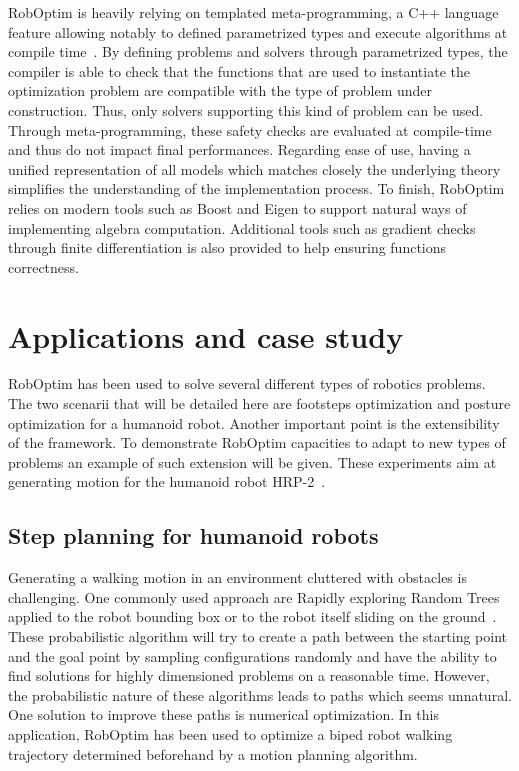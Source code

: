 \documentclass[conference,final,a4paper,twocolumn,9pt]{IEEEtran}
\begin{document}
RobOptim is heavily relying on templated meta-programming, a C++
language feature allowing notably to defined parametrized types and
execute algorithms at compile time~\cite{iso14882}. By defining
problems and solvers through parametrized types, the compiler is able
to check that the functions that are used to instantiate the
optimization problem are compatible with the type of problem under
construction. Thus, only solvers supporting this kind of problem can be
used. Through meta-programming, these safety checks are evaluated at
compile-time and thus do not impact final performances. Regarding ease
of use, having a unified representation of all models which matches
closely the underlying theory simplifies the understanding of the
implementation process.  To finish, RobOptim relies on modern tools
such as Boost and Eigen to support natural ways of implementing
algebra computation. Additional tools such as gradient checks through
finite differentiation is also provided to help ensuring functions
correctness.


\section{Applications and case study}\label{sec:application}


RobOptim has been used to solve several different types of robotics
problems. The two scenarii that will be detailed here are footsteps
optimization and posture optimization for a humanoid robot. Another
important point is the extensibility of the framework. To demonstrate
RobOptim capacities to adapt to new types of problems an example of
such extension will be given. These experiments aim at generating
motion for the humanoid robot HRP-2~\cite{hrp2}.


\subsection{Step planning for humanoid robots}


Generating a walking motion in an environment cluttered with obstacles
is challenging. One commonly used approach are Rapidly exploring
Random Trees
applied to the robot bounding box or to the robot itself sliding on the ground~\cite{dalibard2011small}.
These probabilistic algorithm will try to create a path
between the starting point and the goal point by sampling
configurations randomly and have the ability to find solutions for
highly dimensioned problems on a reasonable time. However, the
probabilistic nature of these algorithms leads to paths which seems
unnatural. One solution to improve these paths is numerical
optimization. In this application, RobOptim has been used to optimize
a biped robot walking trajectory determined beforehand by a motion
planning algorithm.
\end{document}
